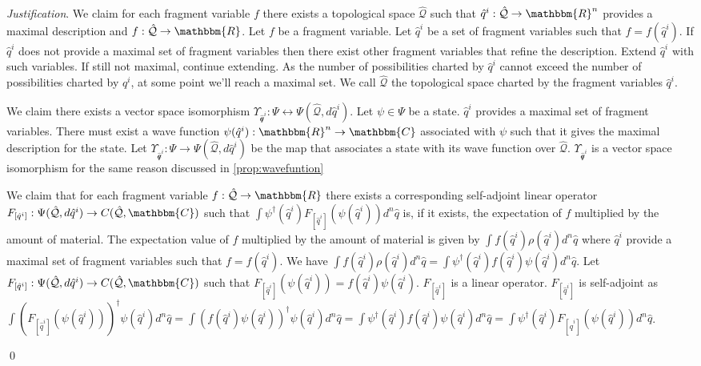 \documentclass[aps,pra,10pt,twocolumn,floatfix,nofootinbib]{revtex4-1}
\numberwithin{equation}{section}
\theoremstyle{definition}
\newenvironment{justification}{\emph{Justification}.}{\qed}
\begin{document}
\begin{justification}
	We claim for each fragment variable $f$ there exists a topological space $\hat{\mathcal{Q}}$ such that  $\hat{q}^i : \hat{\mathcal{Q}} \rightarrow \mathbbm{R}^n$ provides a maximal description and $f : \hat{\mathcal{Q}} \rightarrow \mathbbm{R}$. Let $f$ be a fragment variable. Let $\hat{q}^i$ be a set of fragment variables such that $f=f(\hat{q}^i)$. If $\hat{q}^i$ does not provide a maximal set of fragment variables then there exist other fragment variables that refine the description. Extend $\hat{q}^i$ with such variables. If still not maximal, continue extending. As the number of possibilities charted by $\hat{q}^i$ cannot exceed the number of possibilities charted by $q^i$, at some point we'll reach a maximal set. We call $\hat{\mathcal{Q}}$ the topological space charted by the fragment variables $\hat{q}^i$.
	
	We claim there exists a vector space isomorphism $\Upsilon_{\hat{\mathcal{q}}^i} : \Psi \leftrightarrow \Psi(\hat{\mathcal{Q}}, d\hat{q}^i)$. Let $\psi \in \Psi$ be a state. $\hat{q}^i$ provides a maximal set of fragment variables. There must exist a wave function $\psi(\hat{q}^i) : \mathbbm{R}^n \rightarrow \mathbbm{C}$ associated with $\psi$ such that it gives the maximal description for the state. Let $\Upsilon_{\hat{\mathcal{q}}^i} : \Psi \rightarrow \Psi(\hat{\mathcal{Q}}, d\hat{q}^i)$ be the map that associates a state with its wave function over $\hat{\mathcal{Q}}$. $\Upsilon_{\hat{\mathcal{q}}^i}$ is a vector space isomorphism for the same reason discussed in \ref{prop:wavefuntion}
	
	We claim that for each fragment variable $f : \hat{\mathcal{Q}} \rightarrow \mathbbm{R}$ there exists a corresponding self-adjoint linear operator $F_{[\hat{q}^i]} : \Psi(\hat{\mathcal{Q}}, d\hat{q}^i) \rightarrow C(\hat{\mathcal{Q}}, \mathbbm{C})$ such that $\int \psi^\dagger(\hat{q}^i) F_{[\hat{q}^i]}( \psi(\hat{q}^i)) d^n \hat{q}$ is, if it exists, the expectation of $f$ multiplied by the amount of material. The expectation value of $f$ multiplied by the amount of material is given by $\int f(\hat{q}^i) \rho(\hat{q}^i) d^n\hat{q}$ where $\hat{q}^i$ provide a maximal set of fragment variables such that $f=f(\hat{q}^i)$. We have $\int f(\hat{q}^i) \rho(\hat{q}^i) d^n\hat{q} = \int \psi^\dagger(\hat{q}^i) f(\hat{q}^i) \psi(\hat{q}^i) d^{n}\hat{q}$. Let $F_{[\hat{q}^i]} : \Psi(\hat{\mathcal{Q}}, d\hat{q}^i) \rightarrow C(\hat{\mathcal{Q}}, \mathbbm{C})$ such that $F_{[\hat{q}^i]} (\psi(\hat{q}^i)) = f(\hat{q}^i) \psi(\hat{q}^i)$. $F_{[\hat{q}^i]}$ is a linear operator. $F_{[\hat{q}^i]}$ is self-adjoint as $\int (F_{[\hat{q}^i]}(\psi(\hat{q}^i)))^\dagger \psi(\hat{q}^i) d^{n}\hat{q} = \int (f(\hat{q}^i) \psi(\hat{q}^i))^\dagger \psi(\hat{q}^i) d^{n}\hat{q} = \int \psi^\dagger(\hat{q}^i) f(\hat{q}^i) \psi(\hat{q}^i) d^{n}\hat{q} = \int \psi^\dagger(\hat{q}^i) F_{[\hat{q}^i]} (\psi(\hat{q}^i)) d^{n}\hat{q}$.
		

\end{justification}
\end{document}
